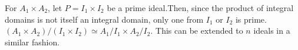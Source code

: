\hspace*{10mm} For $A_1\times A_2$, let $P=I_1\times I_2$ be a
prime ideal.Then, since the product of integral domains is not
itself an integral domain, only one from $I_1$ or $I_2$ is prime.
$(A_1\times A_2)/(I_1\times I_2)\simeq A_1/I_1 \times A_2/I_2$.
This can be extended to $n$ ideals in a similar fashion.